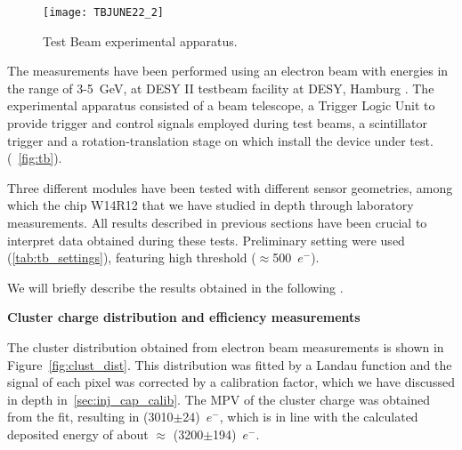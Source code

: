 \begin{figure}[h!]
\centering
\texttt{[image: TBJUNE22\_2]}
\caption{Test Beam experimental apparatus.}
\label{fig:tb}
\end{figure}

The measurements have been performed using an electron beam with energies in the range of 3-\SI{5}{GeV}, at DESY II testbeam facility at DESY, Hamburg \cite{Diener:2018qap}. The experimental apparatus consisted of a beam telescope, a Trigger Logic Unit to provide trigger and control signals employed during test beams, a scintillator trigger and a rotation-translation stage on which install the device under test. (~\autoref{fig:tb}).


\begin{comment}
\begin{figure}[h!]
\centering
\subfigure[Test beam apparatus.]
{\texttt{[image: TBJUNE22\_PHOTO]}}\quad
\subfigure[Test beam schematics.]
{\texttt{[image: TBJUNE22]}}\\
\caption{Test Beam setting at DESY.}
\label{fig:tb}
\end{figure}
\end{comment}

Three different modules have been tested with different sensor geometries, among which the chip W14R12 that we have studied in depth through laboratory measurements. All results described in previous sections have been crucial to interpret data obtained during these tests. Preliminary setting were used (\autoref{tab:tb_settings}), featuring high threshold ($\approx$500~$e^{-}$).

We will briefly describe the results obtained in the following \cite{BelleIIVTXUpgradeGroup:2023isk}.

\bigskip


\textbf{Cluster charge distribution and efficiency measurements}

\medskip

The cluster distribution obtained from electron beam measurements is shown in Figure~\autoref{fig:clust_dist}. 
This distribution was fitted by a Landau function and the signal of each pixel was corrected by a calibration factor, which we have discussed in depth in~\autoref{sec:inj_cap_calib}.
The MPV of the cluster charge was obtained from the fit, resulting in (3010$\pm$24)~$e^{-}$, which is in line with the calculated deposited energy of about $\approx$ (3200$\pm$194)~$e^{-}$.\\


